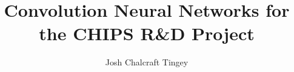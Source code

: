 \documentclass[hyperpdf,bindnopdf]{hepthesis}  %
\title{Convolution Neural Networks for the CHIPS R\&D Project}
\author{Josh Chalcraft Tingey}
\begin{document}

\begin{frontmatter}
    
\end{frontmatter}

\begin{mainmatter}
    
    
    
    
    
    
    
\end{mainmatter}

\begin{appendices}
    
\end{appendices}

\begin{backmatter}
    
\end{backmatter}
\end{document}
